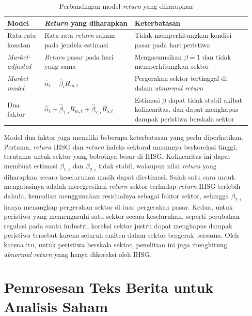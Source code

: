 \begin{table}[t]
  \centering
  \caption{Perbandingan model \emph{return} yang diharapkan}
  \label{tab:model-return}
  \begin{tabularx}{\textwidth}{| p{2.6cm} | X | X |}
    \hline
    \textbf{Model} & \textbf{\emph{Return} yang diharapkan} & \textbf{Keterbatasan} \\
    \hline
    Rata-rata konstan & Rata-rata \emph{return} saham pada jendela estimasi & Tidak memperhitungkan kondisi pasar pada hari peristiwa \\
    \hline
    \emph{Market-adjusted} & \emph{Return} pasar pada hari yang sama & Mengasumsikan $\beta = 1$ dan tidak memperhitungkan sektor \\
    \hline
    \emph{Market model} & $\hat{\alpha}_i + \hat{\beta}_i R_{m,t}$ & Pergerakan sektor tertinggal di dalam \emph{abnormal return} \\
    \hline
    Dua faktor & $\hat{\alpha}_i + \hat{\beta}_{1,i} R_{m,t} + \hat{\beta}_{2,i} R_{s,t}$ & Estimasi $\beta$ dapat tidak stabil akibat kolinearitas, dan dapat menghapus dampak peristiwa berskala sektor \\
    \hline
  \end{tabularx}
\end{table}

Model dua faktor juga memiliki beberapa keterbatasan yang perlu diperhatikan. Pertama, \emph{return} IHSG dan \emph{return} indeks sektoral umumnya berkorelasi tinggi, terutama untuk sektor yang bobotnya besar di IHSG. Kolinearitas ini dapat membuat estimasi $\beta_{1,i}$ dan $\beta_{2,i}$ tidak stabil, walaupun nilai \emph{return} yang diharapkan secara keseluruhan masih dapat diestimasi. Salah satu cara untuk mengatasinya adalah meregresikan \emph{return} sektor terhadap \emph{return} IHSG terlebih dahulu, kemudian menggunakan residualnya sebagai faktor sektor, sehingga $\beta_{2,i}$ hanya menangkap pergerakan sektor di luar pergerakan pasar. Kedua, untuk peristiwa yang memengaruhi satu sektor secara keseluruhan, seperti perubahan regulasi pada suatu industri, koreksi sektor justru dapat menghapus dampak peristiwa tersebut karena seluruh emiten dalam sektor bergerak bersama. Oleh karena itu, untuk peristiwa berskala sektor, penelitian ini juga menghitung \emph{abnormal return} yang hanya dikoreksi oleh IHSG.

\section{Pemrosesan Teks Berita untuk Analisis Saham}
\label{sec:pemrosesan-teks}

